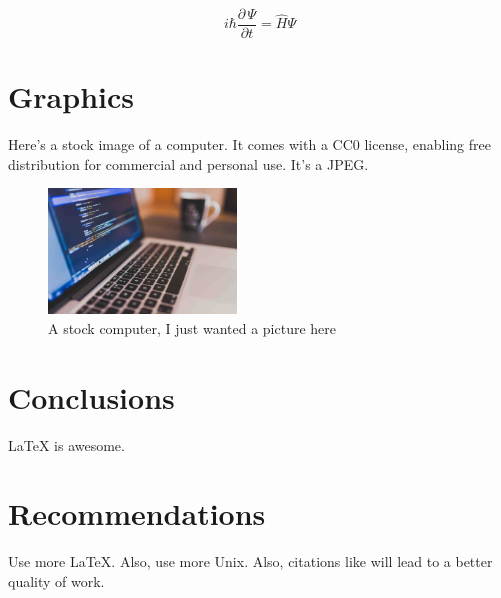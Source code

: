 \documentclass{workreport}
\begin{document}
\begin{body}
	\begin{equation}
		i\hbar \frac{\partial \, \Psi}{\partial t} = \hat{H}\Psi
	\end{equation}

\section{Graphics}

	Here's a stock image of a computer. It comes with a CC0 license, enabling
	free distribution for commercial and personal use. It's a JPEG.

	\begin{figure}[!ht]
		\centering
		\label{fig:stock_computer}
		\includegraphics[width=5cm]{./images/stock-image.jpg}
		\caption{A stock computer, I just wanted a picture here}
	\end{figure}

\section{Conclusions}

	\gls{LaTeX} is awesome.

\section{Recommendations}

	Use more \LaTeX. Also, use more \gls{Unix}. Also, citations like
    	\cite{k_townsend_ble} will lead to a better quality of work.

\end{body}
\end{document}
